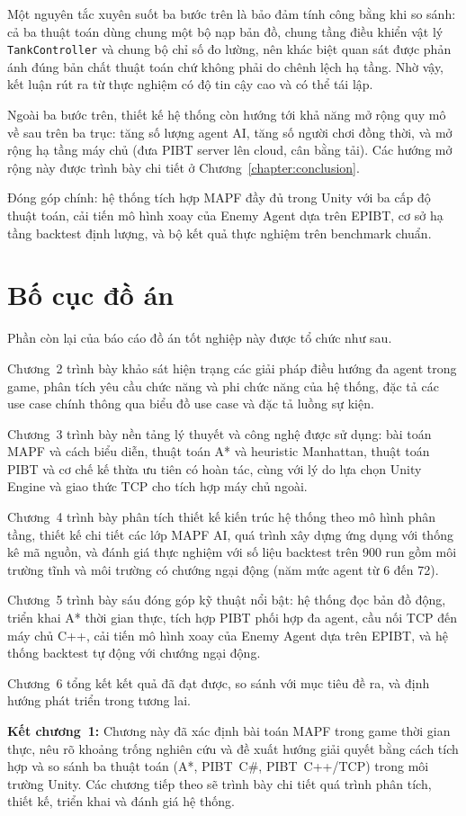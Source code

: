 \documentclass[../DoAn.tex]{subfiles}
\begin{document}
Một nguyên tắc xuyên suốt ba bước trên là bảo đảm tính công bằng khi so sánh: cả ba thuật toán
dùng chung một bộ nạp bản đồ, chung tầng điều khiển vật lý \texttt{TankController} và chung bộ
chỉ số đo lường, nên khác biệt quan sát được phản ánh đúng bản chất thuật toán chứ không phải do
chênh lệch hạ tầng. Nhờ vậy, kết luận rút ra từ thực nghiệm có độ tin cậy cao và có thể tái lập.

Ngoài ba bước trên, thiết kế hệ thống còn hướng tới khả năng mở rộng quy mô về sau trên
ba trục: tăng số lượng agent AI, tăng số người chơi đồng thời, và mở rộng hạ tầng máy
chủ (đưa PIBT server lên cloud, cân bằng tải). Các hướng mở rộng này được trình bày chi
tiết ở Chương~\ref{chapter:conclusion}.

Đóng góp chính: hệ thống tích hợp MAPF đầy đủ trong Unity với ba cấp độ thuật toán, cải tiến
mô hình xoay của Enemy Agent dựa trên EPIBT, cơ sở hạ tầng backtest định lượng, và bộ kết quả
thực nghiệm trên benchmark chuẩn.

\section{Bố cục đồ án}
\label{section:1.4}

Phần còn lại của báo cáo đồ án tốt nghiệp này được tổ chức như sau.

Chương~2 trình bày khảo sát hiện trạng các giải pháp điều hướng đa agent trong game,
phân tích yêu cầu chức năng và phi chức năng của hệ thống, đặc tả các use case chính
thông qua biểu đồ use case và đặc tả luồng sự kiện.

Chương~3 trình bày nền tảng lý thuyết và công nghệ được sử dụng: bài toán MAPF và
cách biểu diễn, thuật toán A* và heuristic Manhattan, thuật toán PIBT và cơ chế kế
thừa ưu tiên có hoàn tác, cùng với lý do lựa chọn Unity Engine và giao thức TCP cho
tích hợp máy chủ ngoài.

Chương~4 trình bày phân tích thiết kế kiến trúc hệ thống theo mô hình phân tầng,
thiết kế chi tiết các lớp MAPF AI, quá trình xây dựng ứng dụng với thống kê mã nguồn,
và đánh giá thực nghiệm với số liệu backtest trên 900 run gồm môi trường tĩnh và môi
trường có chướng ngại động (năm mức agent từ 6 đến 72).

Chương~5 trình bày sáu đóng góp kỹ thuật nổi bật: hệ thống đọc bản đồ động, triển khai
A* thời gian thực, tích hợp PIBT phối hợp đa agent, cầu nối TCP đến máy chủ C++, cải tiến
mô hình xoay của Enemy Agent dựa trên EPIBT, và hệ thống backtest tự động với chướng ngại động.

Chương~6 tổng kết kết quả đã đạt được, so sánh với mục tiêu đề ra, và định hướng
phát triển trong tương lai.

\textbf{Kết chương~1:} Chương này đã xác định bài toán MAPF trong game thời gian thực,
nêu rõ khoảng trống nghiên cứu và đề xuất hướng giải quyết bằng cách tích hợp và so
sánh ba thuật toán (A*, PIBT~C\#, PIBT~C++/TCP) trong môi trường Unity. Các chương tiếp
theo sẽ trình bày chi tiết quá trình phân tích, thiết kế, triển khai và đánh giá hệ thống.
\end{document}
